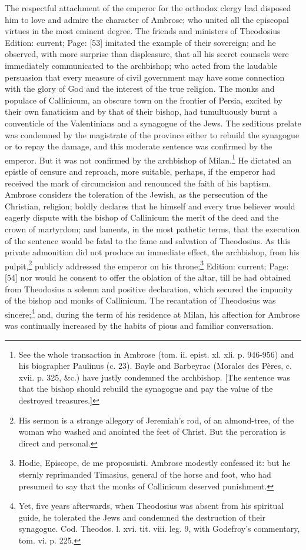 The respectful attachment of the emperor for the orthodox clergy had disposed him to love and admire the character of Ambrose; who united all the episcopal virtues in the most eminent degree. The friends and ministers of Theodosius Edition: current; Page: [53] imitated the example of their sovereign; and he observed, with more surprise than displeasure, that all his secret counsels were immediately communicated to the archbishop; who acted from the laudable persuasion that every measure of civil government may have some connection with the glory of God and the interest of the true religion. The monks and populace of Callinicum, an obscure town on the frontier of Persia, excited by their own fanaticism and by that of their bishop, had tumultuously burnt a conventicle of the Valentinians and a synagogue of the Jews. The seditious prelate was condemned by the magistrate of the province either to rebuild the synagogue or to repay the damage, and this moderate sentence was confirmed by the emperor. But it was not confirmed by the archbishop of Milan.\footnote{See the whole transaction in Ambrose (tom. ii. epist. xl. xli. p. 946-956) and his biographer Paulinus (c. 23). Bayle and Barbeyrac (Morales des Pères, c. xvii. p. 325, \&c.) have justly condemned the archbishop. [The sentence was that the bishop should rebuild the synagogue and pay the value of the destroyed treasures.]} He dictated an epistle of censure and reproach, more suitable, perhaps, if the emperor had received the mark of circumcision and renounced the faith of his baptism. Ambrose considers the toleration of the Jewish, as the persecution of the Christian, religion; boldly declares that he himself and every true believer would eagerly dispute with the bishop of Callinicum the merit of the deed and the crown of martyrdom; and laments, in the most pathetic terms, that the execution of the sentence would be fatal to the fame and salvation of Theodosius. As this private admonition did not produce an immediate effect, the archbishop, from his pulpit,\footnote{His sermon is a strange allegory of Jeremiah\texthebrew{}’s rod, of an almond-tree, of the woman who washed and anointed the feet of Christ. But the peroration is direct and personal.} publicly addressed the emperor on his throne;\footnote{Hodie, Episcope, de me proposuisti. Ambrose modestly confessed it: but he sternly reprimanded Timasius, general of the horse and foot, who had presumed to say that the monks of Callinicum deserved punishment.} Edition: current; Page: [54] nor would he consent to offer the oblation of the altar, till he had obtained from Theodosius a solemn and positive declaration, which secured the impunity of the bishop and monks of Callinicum. The recantation of Theodosius was sincere;\footnote{Yet, five years afterwards, when Theodosius was absent from his spiritual guide, he tolerated the Jews and condemned the destruction of their synagogue. Cod. Theodos. l. xvi. tit. viii. leg. 9, with Godefroy\texthebrew{}’s commentary, tom. vi. p. 225.} and, during the term of his residence at Milan, his affection for Ambrose was continually increased by the habits of pious and familiar conversation.

